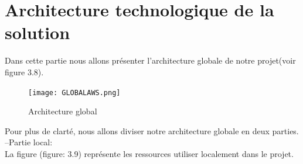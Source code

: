 %  
%
%  
\section{\selectfont\Large Architecture technologique de la solution}
 Dans cette partie nous allons présenter l'architecture globale de notre projet(voir figure 3.8).
\begin{landscape}
  \begin{figure}[htbp]
    \centering
  \texttt{[image: GLOBALAWS.png]}  
    \caption{Architecture global}
  \end{figure}
\end{landscape}
 Pour plus de clarté, nous allons diviser notre architecture globale en deux parties.\\
\indent--Partie local: \\[0.02cm]
La figure (figure: 3.9) représente les ressources utiliser localement dans le projet.


